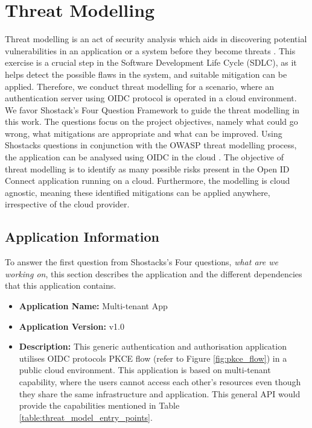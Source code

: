 \chapter{Threat Modelling}
\label{chap:threat_model}
Threat modelling is an act of security analysis which aids in discovering potential vulnerabilities in an application or a system before they become threats \citep{threat_model_intro}.
This exercise is a crucial step in the Software Development Life Cycle (SDLC), as it helps detect the possible flaws in the system, and suitable mitigation can be applied.
Therefore, we conduct threat modelling for a scenario, where an authentication server using OIDC protocol is operated in a cloud environment.
We favor Shostack's Four Question Framework \citep{shostack} to guide the threat modelling in this work.
The questions focus on the project objectives, namely what could go wrong, what mitigations are appropriate and what can be improved.
Using Shostacks questions in conjunction with the OWASP threat modelling process, the application can be analysed using OIDC in the cloud \citep{owasp_threat_model}.
The objective of threat modelling is to identify as many possible risks present in the Open ID Connect application running on a cloud.
Furthermore, the modelling is cloud agnostic, meaning these identified mitigations can be applied anywhere, irrespective of the cloud provider.

\section{Application Information}
To answer the first question from Shostacks's Four questions, \textit{what are we working on}, this section describes the application and the different dependencies that this application contains.
\newpage
\begin{itemize}
    \item \textbf{Application Name:} Multi-tenant App
    \item \textbf{Application Version:} v1.0
    \item \textbf{Description:} This generic authentication and authorisation application utilises OIDC protocols PKCE flow (refer to Figure \ref{fig:pkce_flow}) in a public cloud environment.
    This application is based on multi-tenant capability, where the users cannot access each other's resources even though they share the same infrastructure and application.
    This general API would provide the capabilities mentioned in Table \ref{table:threat_model_entry_points}.
  \end{itemize}

